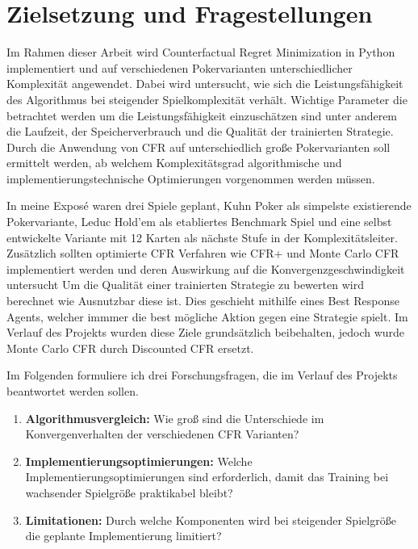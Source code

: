 \section{Zielsetzung und Fragestellungen}

Im Rahmen dieser Arbeit wird Counterfactual Regret Minimization in Python implementiert und auf verschiedenen Pokervarianten unterschiedlicher Komplexität angewendet.
Dabei wird untersucht, wie sich die Leistungsfähigkeit des Algorithmus bei steigender Spielkomplexität verhält.
Wichtige Parameter die betrachtet werden um die Leistungsfähigkeit einzuschätzen sind unter anderem die Laufzeit, der Speicherverbrauch und die Qualität der trainierten Strategie.
Durch die Anwendung von CFR auf unterschiedlich große Pokervarianten soll ermittelt werden, ab welchem Komplexitätsgrad algorithmische und implementierungstechnische Optimierungen vorgenommen werden müssen.

In meine Exposé waren drei Spiele geplant, Kuhn Poker als simpelste existierende Pokervariante, Leduc Hold'em als etabliertes Benchmark Spiel und eine selbst entwickelte Variante mit 12 Karten als nächste Stufe in der Komplexitätsleiter.\\
Zusätzlich sollten optimierte CFR Verfahren wie CFR+ und Monte Carlo CFR implementiert werden und deren Auswirkung auf die Konvergenzgeschwindigkeit untersucht
Um die Qualität einer trainierten Strategie zu bewerten wird berechnet wie Ausnutzbar diese ist.
Dies geschieht mithilfe eines Best Response Agents, welcher immmer die best mögliche Aktion gegen eine Strategie spielt.
Im Verlauf des Projekts wurden diese Ziele grundsätzlich beibehalten, jedoch wurde Monte Carlo CFR durch Discounted CFR ersetzt.

Im Folgenden formuliere ich drei Forschungsfragen, die im Verlauf des Projekts beantwortet werden sollen.
\begin{enumerate}
    \item \textbf{Algorithmusvergleich:} 
    Wie groß sind die Unterschiede im Konvergenverhalten der verschiedenen CFR Varianten?
    
    \item \textbf{Implementierungsoptimierungen:} 
    Welche Implementierungsoptimierungen sind erforderlich, damit das Training bei wachsender Spielgröße praktikabel bleibt?
    
    \item \textbf{Limitationen:} 
    Durch welche Komponenten wird bei steigender Spielgröße die geplante Implementierung limitiert?
\end{enumerate}

